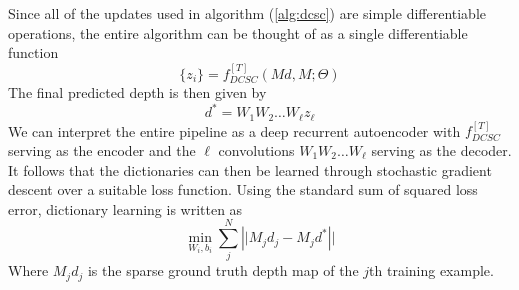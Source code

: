Since all of the updates used in algorithm (\ref{alg:dcsc}) are simple differentiable operations, the entire algorithm can be thought of as a single differentiable function
\begin{equation}
  \label{eq:7}
  \{ z_i \} = f^{[T]}_{DCSC}(Md, M; \Theta)
\end{equation}
The final predicted depth is then given by
\begin{equation}
  \label{eq:8}
  d^{*} = W_1W_2\ldots W_{\ell}z_{\ell}
\end{equation}
We can interpret the entire pipeline as a deep recurrent autoencoder with  $f^{[T]}_{DCSC}$ serving as the encoder and the $\ell$ convolutions $W_1W_2\ldots W_{\ell}$ serving as the decoder. It follows that the dictionaries can then be learned through stochastic gradient descent over a suitable loss function. Using the standard sum of squared loss error, dictionary learning is written as
\begin{equation}
  \label{eq:9}
  \min_{W_i, b_i} \sum_j^{N}\left||M_{j}d_j - M_jd^{*}\right||
\end{equation}
Where $M_jd_j$ is the sparse ground truth depth map of the $j$th training example.
